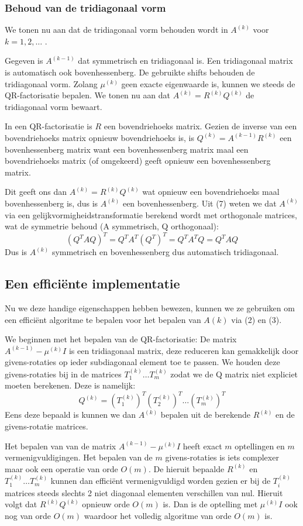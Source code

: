 \documentclass[a4paper]{article}
\begin{document}
\subsubsection{Behoud van de tridiagonaal vorm}
	We tonen nu aan dat de tridiagonaal vorm behouden wordt in $A^{(k)}$ voor $k = 1,2,\dots$ .
	
	\noindent Gegeven is $A^{(k-1)}$ dat symmetrisch en tridiagonaal is. Een tridiagonaal matrix is automatisch ook bovenhessenberg.
	De gebruikte shifts behouden de tridiagonaal vorm. Zolang $\mu ^{(k)}$ geen exacte eigenwaarde is, kunnen we steeds de QR-factorisatie bepalen. We tonen nu aan dat $A^{(k)} = R^{(k)}Q^{(k)}$ de tridiagonaal vorm bewaart.
	
	\noindent In een QR-factorisatie is $R$ een bovendriehoeks matrix. Gezien de inverse van een bovendriehoeks matrix opnieuw bovendriehoeks is, is $Q^{(k)} = A^{(k-1)}R^{(k)}$ een bovenhessenberg matrix want een bovenhessenberg matrix maal een bovendriehoeks matrix (of omgekeerd) geeft opnieuw een bovenhessenberg matrix.
	
	\noindent Dit geeft ons dan $A^{(k)} = R^{(k)}Q^{(k)}$ wat opnieuw een bovendriehoeks maal bovenhessenberg is, dus is $A^{(k)}$ een bovenhessenberg. Uit (7) weten we dat $A^{(k)}$ via een gelijkvormigheidstransformatie berekend wordt met orthogonale matrices, wat de symmetrie behoud (A symmetrisch, Q orthogonaal):
	\[
		(Q^TAQ)^T = Q^TA^T(Q^T)^T = Q^TA^TQ = Q^TAQ
	\]
	Dus is $A^{(k)}$ symmetrisch en bovenhessenberg dus automatisch tridiagonaal.
\subsection{Een efficiënte implementatie}
Nu we deze handige eigenschappen hebben bewezen, kunnen we ze gebruiken om een efficiënt algoritme te bepalen voor het bepalen van $A(k)$ via (2) en (3).

\noindent We beginnen met het bepalen van de QR-factorisatie: De matrix $A^{(k-1)} - \mu ^{(k)}I$ is een tridiagonaal matrix, deze reduceren kan gemakkelijk door givens-rotaties op ieder subdiagonaal element toe te passen. We houden deze givens-rotaties bij in de matrices $T^{(k)}_1\dots T^{(k)}_m$ zodat we de Q matrix niet expliciet moeten berekenen. Deze is namelijk:
\[
	Q^{(k)} = (T^{(k)}_1)^T(T^{(k)}_2)^T \dots (T^{(k)}_m)^T 
\]
Eens deze bepaald is kunnen we dan $A^{(k)}$ bepalen uit de berekende $R^{(k)}$ en de givens-rotatie matrices.

\noindent Het bepalen van van de matrix  $A^{(k-1)} - \mu ^{(k)}I$ heeft exact $m$ optellingen en $m$ vermenigvuldigingen.
Het bepalen van de $m$ givens-rotaties is iets complexer maar ook een operatie van orde $O(m)$. De hieruit bepaalde $R^{(k)}$ en $T^{(k)}_1\dots T^{(k)}_m$ kunnen dan efficiënt vermenigvuldigd worden gezien er bij de $T^{(k)}_i$ matrices steeds slechts 2 niet diagonaal elementen verschillen van nul. Hieruit volgt dat $R^{(k)}Q^{(k)}$ opnieuw orde $O(m)$ is. Dan is de optelling met $\mu ^{(k)}I$ ook nog van orde $O(m)$ waardoor het volledig algoritme van orde $O(m)$ is.
\end{document}
